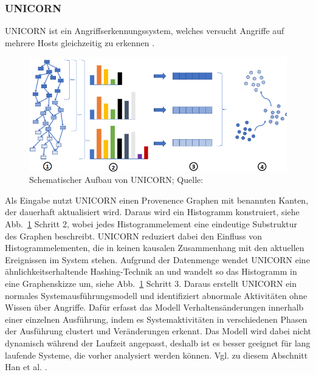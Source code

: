 \documentclass[conference]{IEEEtran}
\begin{document}
\subsubsection{UNICORN}
UNICORN ist ein Angriffserkennungssystem, welches versucht Angriffe auf mehrere Hosts gleichzeitig zu erkennen \cite{Han2020}.
\begin{figure}[htbp]
    \centerline{\includegraphics[scale=0.6]{figures/UNICORN.png}}
    \caption{Schematischer Aufbau von UNICORN; Quelle: \cite{Han2020}}
    \label{fig.unicorn}
\end{figure}
Als Eingabe nutzt UNICORN einen Provenence Graphen mit benannten Kanten, der dauerhaft aktualisiert wird.
Daraus wird ein Histogramm konstruiert, siehe Abb.~\ref{fig.unicorn} Schritt 2, wobei jedes Histogrammelement eine eindeutige Substruktur des Graphen beschreibt.
UNICORN reduziert dabei den Einfluss von Histogrammelementen, die in keinen kausalen Zusammenhang mit den aktuellen Ereignissen im System stehen.
Aufgrund der Datenmenge wendet UNICORN eine ähnlichkeitserhaltende Hashing-Technik an und wandelt so das Histogramm in eine Graphenskizze um, siehe Abb.~\ref{fig.unicorn} Schritt 3.
Daraus erstellt UNICORN ein normales Systemausführungsmodell und identifiziert abnormale Aktivitäten ohne Wissen über Angriffe.
Dafür erfasst das Modell Verhaltensänderungen innerhalb einer einzelnen Ausführung, indem es Systemaktivitäten in verschiedenen Phasen der Ausführung clustert und Veränderungen erkennt.
Das Modell wird dabei nicht dynamisch während der Laufzeit angepasst, deshalb ist es besser geeignet für lang laufende Systeme, die vorher analysiert werden können.
Vgl. zu diesem Abschnitt Han et al. \cite{Han2020}.
\end{document}
